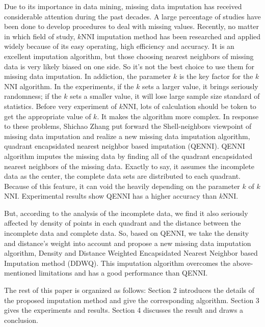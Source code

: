 \documentclass[print]{jicspack}
\begin{document}
Due to its importance in data mining, missing data imputation has received considerable attention during the past decades. A large percentage of studies\cite{Research1,Research2,Research3,Research4,Research5} have been done to develop procedures to deal with missing values. Recently, no matter in which field of study, $k$NNI\cite{KNNI2,KNNI3,KNNI4} imputation method has been researched and applied widely because of its easy operating, high efficiency and accuracy. It is an excellent imputation algorithm, but those choosing nearest neighbors of missing data is very likely biased on one side. So it's not the best choice to use them for missing data imputation. In addiction, the parameter $k$ is the key factor for the $k$NNI algorithm. In the experiments, if the $k$ sets a larger value, it brings seriously randomness; if the $k$ sets a smaller value, it will lose large sample size standard of statistics. Before very experiment of $k$NNI, lots of calculation should be token to get the appropriate value of $k$. It makes the algorithm more complex. In response to these problems, Shichao Zhang put forward the Shell-neighbors\cite{Shell} viewpoint of missing data imputation and realize a new missing data imputation algorithm, quadrant encapsidated nearest neighbor based imputation (QENNI)\cite{QENNI}. QENNI algorithm imputes the missing data by finding all of the quadrant encapsidated nearest neighbors of the missing data. Exactly to say, it assumes the incomplete data as the center, the complete data sets are distributed to each quadrant. Because of this feature, it can void the heavily depending on the parameter $k$ of $k$NNI. Experimental results show QENNI has a higher accuracy than $k$NNI.

But, according to the analysis of the incomplete data, we find it also seriously affected by density of points in each quadrant and the distance between the incomplete data and complete data. So, based on QENNI,  we take the density and distance's weight into account and propose a new missing data imputation algorithm, Density and Distance Weighted Encapsidated Nearest Neighbor based Imputation method (DDWQ). This imputation algorithm overcomes the above-mentioned limitations and has a good performance than QENNI.

The rest of this paper is organized as follows: Section 2 introduces the details of the proposed imputation method and give the corresponding algorithm. Section 3 gives the experiments and results. Section 4 discusses the result and draws a conclusion.
\end{document}
